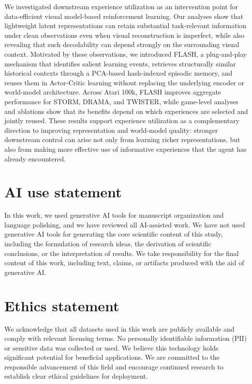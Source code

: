 \documentclass{article} %
\begin{document}
We investigated downstream experience utilization as an intervention point for data-efficient visual model-based reinforcement learning. Our analyses show that lightweight latent representations can retain substantial task-relevant information under clean observations even when visual reconstruction is imperfect, while also revealing that such decodability can depend strongly on the surrounding visual context. Motivated by these observations, we introduced FLASH, a plug-and-play mechanism that identifies salient learning events, retrieves structurally similar historical contexts through a PCA-based hash-indexed episodic memory, and reuses them in Actor-Critic learning without replacing the underlying encoder or world-model architecture. Across Atari 100k, FLASH improves aggregate performance for STORM, DRAMA, and TWISTER, while game-level analyses and ablations show that its benefits depend on which experiences are selected and jointly reused. These results support experience utilization as a complementary direction to improving representation and world-model quality: stronger downstream control can arise not only from learning richer representations, but also from making more effective use of informative experiences that the agent has already encountered.

\section*{AI use statement}

In this work, we used generative AI tools for manuscript organization and language polishing, and we have reviewed all AI-assisted work.
We have not used generative AI tools for generating the core scientific content of this
study, including the formulation of research ideas,
the derivation of scientific conclusions, or the interpretation of results. We take responsibility for the final content of this work,
including text, claims, or artifacts produced with the aid of generative AI.


\section*{Ethics statement}

We acknowledge that all datasets used in this work are publicly available and comply with relevant licensing terms. No personally identifiable information (PII) or sensitive data was collected or used.  We believe this technology holds significant potential for beneficial applications. We are committed to the responsible advancement of this field and encourage continued research to establish clear ethical guidelines for deployment.
\end{document}
